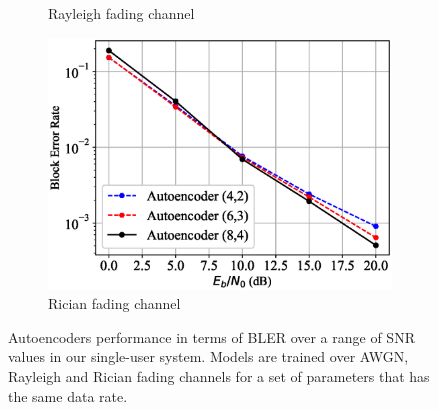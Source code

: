 \begin{figure}[!tp]
\begin{subfigure}{0.3\textwidth}
		\caption{Rayleigh fading channel}	
	\end{subfigure}
	\begin{subfigure}{0.3\textwidth}
		\includegraphics[width=\linewidth]{figs/autoencoder_bler_rician}
		\caption{Rician fading channel}	
	\end{subfigure}
	\caption{Autoencoders performance in terms of BLER over a range of SNR values in our single-user system. Models are trained over AWGN, Rayleigh and Rician fading channels for a set of parameters that has the same data rate.}
	\label{fig:autoencoder_bler}
\end{figure}

